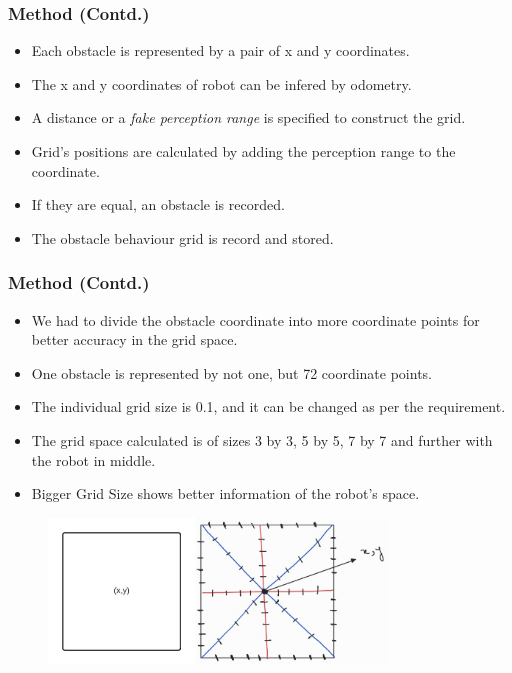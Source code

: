 \documentclass{beamer}
\begin{document}
\begin{frame}
    \frametitle{Method (Contd.)}
    \begin{itemize}
        \item Each obstacle is represented by a pair of x and y coordinates.
        \item The x and y coordinates of robot can be infered by odometry.
        \item A distance or a \textit{fake perception range} is specified to construct the grid.
        \item Grid's positions are calculated by adding the perception range to the coordinate.
        \item If they are equal, an obstacle is recorded.
        \item The obstacle behaviour grid is record and stored.
    \end{itemize}
\end{frame}

\begin{frame}
    \frametitle{Method (Contd.)}
    \begin{itemize}
        \item We had to divide the obstacle coordinate into more coordinate points for better accuracy in the grid space.
        \item One obstacle is represented by not one, but 72 coordinate points.
        \item The individual grid size is 0.1, and it can be changed as per the requirement.
        \item The grid space calculated is of sizes 3 by 3, 5 by 5, 7 by 7 and further with the robot in middle.
        \item Bigger Grid Size shows better information of the robot's space.
    \end{itemize}

    \begin{figure}
        \includegraphics[width=0.8\textwidth]{images/obstacle-grid.jpg}
    \end{figure}
\end{frame}
\end{document}
